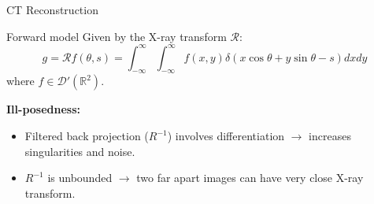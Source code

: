 \begin{frame}{CT Reconstruction}

\begin{block}{Forward model}
Given by the X-ray transform $\mathcal{R}$:
$$
g = \mathcal{R}f(\theta,s)= \int_{-\infty}^{\infty}\int_{-\infty}^{\infty}f(x,y)\delta(x\cos\theta+y\sin\theta-s)dxdy
$$
where $f\in \mathcal{D}'(\mathbb{R}^2)$.
\end{block}

\pause
\bigskip

\textbf{Ill-posedness:}    
\begin{itemize}
\item Filtered back projection ($R^{-1}$) involves differentiation $\longrightarrow$ increases singularities and noise.
 
\item $R^{-1}$ is unbounded $\longrightarrow$ two far apart images can have very close X-ray transform.
\end{itemize}
\end{frame}



